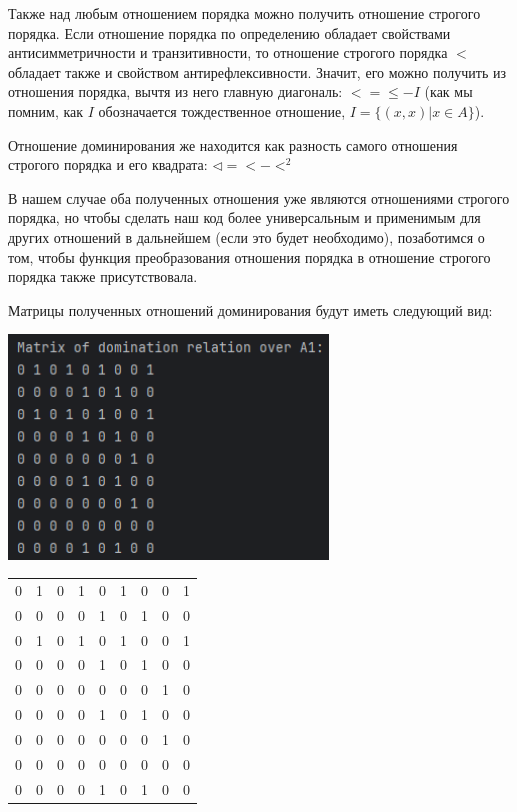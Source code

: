 \documentclass[12pt]{article}
\begin{document}
	Также над любым отношением порядка можно получить отношение строгого порядка. Если отношение порядка по определению обладает свойствами антисимметричности и транзитивности, то отношение строгого порядка $<$ обладает также и свойством антирефлексивности. Значит, его можно получить из отношения порядка, вычтя из него главную диагональ: $< =  \le - I$ (как мы помним, как $I$ обозначается тождественное отношение, $I = \{(x, x) \Big| x \in A\}$).
	
	Отношение доминирования же находится как разность самого отношения строгого порядка и его квадрата: $\triangleleft = < - <^2$
	
	В нашем случае оба полученных отношения уже являются отношениями строгого порядка, но чтобы сделать наш код более универсальным и применимым для других отношений в дальнейшем (если это будет необходимо), позаботимся о том, чтобы функция преобразования отношения порядка в отношение строгого порядка также присутствовала.
	
	 
	
	\newpage

	Матрицы полученных отношений доминирования будут иметь следующий вид:
	
	\parbox[с][70mm][t]{70mm}{
		\includegraphics[width=85mm]{images/dom1.png}
	}
	\hspace{2cm}
	\parbox[с][70mm][c]{60mm}{
		\begin{tabular} {c c c c c c c c c}
			0 & 1 & 0 & 1 & 0 & 1 & 0 & 0 & 1 \\
			0 & 0 & 0 & 0 & 1 & 0 & 1 & 0 & 0 \\
			0 & 1 & 0 & 1 & 0 & 1 & 0 & 0 & 1 \\
			0 & 0 & 0 & 0 & 1 & 0 & 1 & 0 & 0 \\
			0 & 0 & 0 & 0 & 0 & 0 & 0 & 1 & 0 \\
			0 & 0 & 0 & 0 & 1 & 0 & 1 & 0 & 0 \\
			0 & 0 & 0 & 0 & 0 & 0 & 0 & 1 & 0 \\
			0 & 0 & 0 & 0 & 0 & 0 & 0 & 0 & 0 \\
			0 & 0 & 0 & 0 & 1 & 0 & 1 & 0 & 0 \\
		\end{tabular}
	}
	
\end{document}
